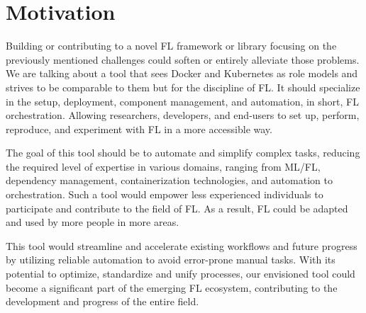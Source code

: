 \section{Motivation}

Building or contributing to a novel FL framework or library focusing on 
the previously mentioned challenges could soften or entirely alleviate those problems. 
We are talking about a tool that sees Docker and Kubernetes as role models
and strives to be comparable to them but for the discipline of FL.
It should specialize in the setup, deployment, component management, and automation,
in short, FL orchestration.
Allowing researchers, developers, and end-users to set up, perform, reproduce,
and experiment with FL in a more accessible way.

The goal of this tool should be to automate and simplify complex tasks,
reducing the required level of expertise in various domains, ranging from ML/FL,
dependency management, containerization technologies, and automation to orchestration.
Such a tool would empower less experienced individuals to participate and contribute to the field of FL.
As a result, FL could be adapted and used by more people in more areas.

This tool would streamline and accelerate existing workflows and future progress
by utilizing reliable automation to avoid error-prone manual tasks.
With its potential to optimize, standardize and unify processes,
our envisioned tool could become a significant part of the emerging FL ecosystem,
contributing to the development and progress of the entire field.